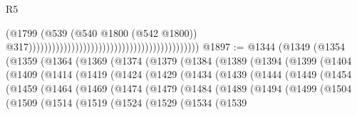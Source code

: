\begin{lexlean}{R5}
\begin{coremodule}
                                                                                        (@1799
                                                                                          (@539
                                                                                            (@540
                                                                                              @1800
                                                                                              (@542
                                                                                                @1800))
                                                                                            @317))))))))))))))))))))))))))))))))))))))))))))
@1897 := @1344
    (@1349
      (@1354
        (@1359
          (@1364
            (@1369
              (@1374
                (@1379
                  (@1384
                    (@1389
                      (@1394
                        (@1399
                          (@1404
                            (@1409
                              (@1414
                                (@1419
                                  (@1424
                                    (@1429
                                      (@1434
                                        (@1439
                                          (@1444
                                            (@1449
                                              (@1454
                                                (@1459
                                                  (@1464
                                                    (@1469
                                                      (@1474
                                                        (@1479
                                                          (@1484
                                                            (@1489
                                                              (@1494
                                                                (@1499
                                                                  (@1504
                                                                    (@1509
                                                                      (@1514
                                                                        (@1519
                                                                          (@1524
                                                                            (@1529
                                                                              (@1534
                                                                                (@1539

\end{coremodule}
\end{lexlean}
